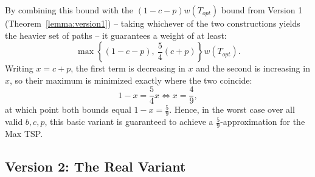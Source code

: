 By combining this bound with the $(1 - c - p)w(T_{opt})$ bound from Version 1
(Theorem~\ref{lemma:version1}) -- taking whichever of the two constructions
yields the heavier set of paths -- it guarantees a weight of at least:
\begin{equation}
\max\left\{(1 - c - p),\ \frac{5}{4}(c + p)\right\} w(T_{opt}).
\end{equation}
Writing $x = c + p$, the first term is decreasing in $x$ and the second is
increasing in $x$, so their maximum is minimized exactly where the two coincide:
\begin{equation}
1 - x = \frac{5}{4}x \iff x = \frac{4}{9},
\end{equation}
at which point both bounds equal $1 - x = \frac{5}{9}$. Hence, in the worst case
over all valid $b, c, p$, this basic variant is guaranteed to achieve a
$\frac{5}{9}$-approximation for the Max TSP.

\subsection{Version 2: The Real Variant}

